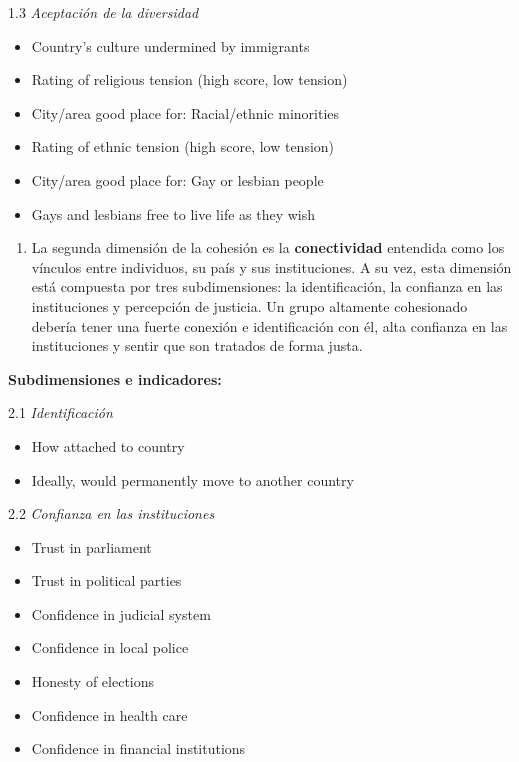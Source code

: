 \documentclass[
  12pt,
]{book}
\providecommand{\tightlist}{%
  \setlength{\itemsep}{0pt}\setlength{\parskip}{0pt}}
\begin{document}
1.3 \emph{Aceptación de la diversidad}

\begin{itemize}
\tightlist
\item
  Country's culture undermined by immigrants
\item
  Rating of religious tension (high score, low tension)
\item
  City/area good place for: Racial/ethnic minorities
\item
  Rating of ethnic tension (high score, low tension)
\item
  City/area good place for: Gay or lesbian people
\item
  Gays and lesbians free to live life as they wish
\end{itemize}

\begin{enumerate}
\def\labelenumi{\arabic{enumi}.}
\setcounter{enumi}{1}
\tightlist
\item
  La segunda dimensión de la cohesión es la \textbf{conectividad} entendida como los vínculos entre individuos, su país y sus instituciones. A su vez, esta dimensión está compuesta por tres subdimensiones: la identificación, la confianza en las instituciones y percepción de justicia. Un grupo altamente cohesionado debería tener una fuerte conexión e identificación con él, alta confianza en las instituciones y sentir que son tratados de forma justa.
\end{enumerate}

\textbf{Subdimensiones e indicadores:}

2.1 \emph{Identificación}

\begin{itemize}
\tightlist
\item
  How attached to country
\item
  Ideally, would permanently move to another country
\end{itemize}

2.2 \emph{Confianza en las instituciones}

\begin{itemize}
\tightlist
\item
  Trust in parliament
\item
  Trust in political parties
\item
  Confidence in judicial system
\item
  Confidence in local police
\item
  Honesty of elections
\item
  Confidence in health care
\item
  Confidence in financial institutions
\end{itemize}
\end{document}
